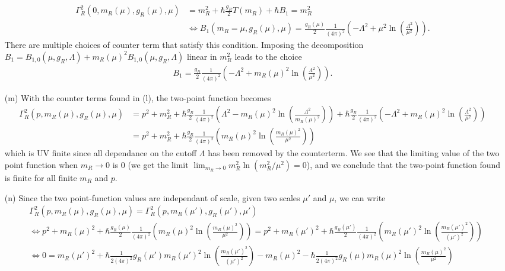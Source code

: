 \documentclass[10pt, a4paper]{article}
\begin{document}
\begin{enumerate}
  \begin{align*}
    \Gamma^{2}_R(0, m_R(\mu), g_R(\mu), \mu) &= m_R^2 + \hbar \frac{g_R}{2} T(m_R) + \hbar B_1  = m_R^2\\
    & \iff B_1(m_R = \mu, g_R(\mu), \mu) = \frac{g_R(\mu)}{2} \frac{1}{(4\pi)^2} \left(-\Lambda^2 + \mu^2 \ln\left(\frac{\Lambda^2}{\mu^2}\right)\right).
  \end{align*}
  There are multiple choices of counter term that satisfy this condition. Imposing the decomposition $B_1 = B_{1, 0}(\mu, g_R, \Lambda) + m_R(\mu)^2 B_{1, 0}(\mu, g_R, \Lambda)$ linear in $m_R^2$ leads to the choice 
  \begin{align*}
    B_1 = \frac{g_R}{2} \frac{1}{(4\pi)^2} \left(-\Lambda^2 + m_R(\mu)^2 \ln\left(\frac{\Lambda^2}{\mu^2}\right)\right).
  \end{align*}
  \item[(m)] With the counter terms found in (l), the two-point function becomes
  \begin{align*}
    \Gamma^{2}_R(p, m_R(\mu), g_R(\mu), \mu) &= p^2 + m_R^2 + \hbar \frac{g_R}{2} \frac{1}{(4\pi)^2} \left(\Lambda^2 - m_R(\mu)^2 \ln\left(\frac{\Lambda^2}{m_R(\mu)^2}\right)\right) + \hbar \frac{g_R}{2} \frac{1}{(4\pi)^2} \left(-\Lambda^2 + m_R(\mu)^2 \ln\left(\frac{\Lambda^2}{\mu^2}\right)\right)\\
    &= p^2 + m_R^2 + \hbar \frac{g_R}{2} \frac{1}{(4\pi)^2} \left( m_R(\mu)^2 \ln\left(\frac{ m_R(\mu)^2}{\mu^2}\right)\right)
  \end{align*}
  which is UV finite since all dependance on the cutoff $\Lambda$ has been removed by the counterterm. We see that the limiting value of the two point function when $m_R \to 0$ is $0$ (we get the limit $\lim_{m_R \to 0} m_R^2 \ln (m_R^2/\mu^2) = 0$), and we conclude that the two-point function found is finite for all finite $m_R$ and $p$.
  \item[(n)] Since the two point-function values are independant of scale, given two scales $\mu'$ and $\mu$, we can write 
  \begin{align*}
    &\Gamma^{2}_R(p, m_R(\mu), g_R(\mu), \mu) = \Gamma^{2}_R(p, m_R(\mu'), g_R(\mu'), \mu')\\
    &\iff 
    p^2 + m_R(\mu)^2 + \hbar \frac{g_R(\mu)}{2} \frac{1}{(4\pi)^2} \left( m_R(\mu)^2 \ln\left(\frac{ m_R(\mu)^2}{\mu^2}\right)\right) = p^2 + m_R(\mu')^2 + \hbar \frac{g_R(\mu')}{2} \frac{1}{(4\pi)^2} \left( m_R(\mu')^2 \ln\left(\frac{ m_R(\mu')^2}{(\mu')^2}\right)\right)\\
    &\iff 0= m_R(\mu')^2 + \hbar \frac{1}{2(4\pi)^2} g_R(\mu') m_R(\mu')^2 \ln\left(\frac{ m_R(\mu')^2}{(\mu')^2}\right) - m_R(\mu)^2  - \hbar \frac{1}{2(4\pi)^2} g_R(\mu) m_R(\mu)^2 \ln\left(\frac{ m_R(\mu)^2}{\mu^2}\right)

\end{align*}
\end{enumerate}
\end{document}
